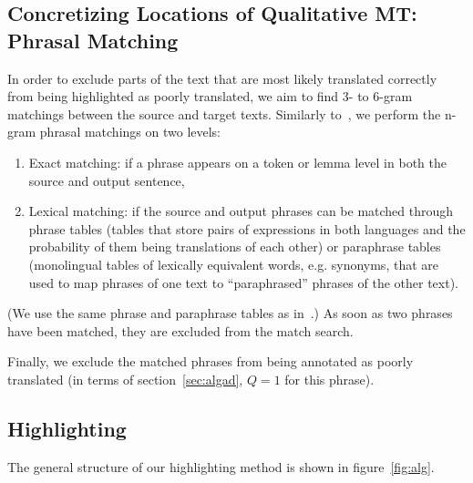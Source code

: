 \documentclass[hidelinks,10pt,letter]{article} %
\begin{document}
    \subsection{Concretizing Locations of Qualitative MT: Phrasal Matching}\label{sec:concr} 
    In order to exclude parts of the text that are most likely translated correctly from being highlighted as poorly translated,
    we aim to find 3- to 6-gram matchings between the source and
    target texts. Similarly to~\cite{mehdad2011using}, we perform the n-gram phrasal matchings on two levels:
    \begin{enumerate}[(1)]
        \item Exact matching: if a phrase appears on a token or lemma level in both the source and output sentence,
        \item Lexical matching: if the source and output phrases can be matched through phrase tables (tables that store pairs of expressions in both languages and 
        the probability of them being translations of each other) or paraphrase tables (monolingual tables of lexically equivalent words, e.g. synonyms, that
        are used to map phrases of one text to ``paraphrased'' phrases of the other text).
    \end{enumerate}
    (We use the same phrase and paraphrase tables as in~\cite{mehdad2012match}.)
    As soon as two phrases have been matched, they are excluded from the match search.
    
    Finally, we exclude the matched phrases from being annotated as poorly translated 
    (in terms of section~\ref{sec:algad}, $Q=1$ for this phrase). 
    

    \subsection{Highlighting}\label{sec:highl}
    
    The general structure of our highlighting method is shown in figure~\ref{fig:alg}. 
    
\end{document}
